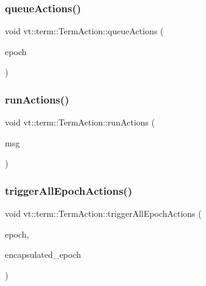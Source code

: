 \mbox{\label{structvt_1_1term_1_1_term_action_a12fe44411dad9ec9564adb12ed82a35f}} 
\subsubsection{\texorpdfstring{queue\+Actions()}{queueActions()}}
{\footnotesize\ttfamily void vt\+::term\+::\+Term\+Action\+::queue\+Actions (\begin{DoxyParamCaption}\item[{\hyperlink{namespacevt_a81d11b28122d43bf9834577e4a06440f}{Epoch\+Type}}]{epoch }\end{DoxyParamCaption})\hspace{0.3cm}{\ttfamily [protected]}}

\mbox{\label{structvt_1_1term_1_1_term_action_a13f4ee69a6e01f65de03320904737c64}} 
\subsubsection{\texorpdfstring{run\+Actions()}{runActions()}}
{\footnotesize\ttfamily void vt\+::term\+::\+Term\+Action\+::run\+Actions (\begin{DoxyParamCaption}\item[{\hyperlink{structvt_1_1term_1_1_term_action_1_1_action_msg}{Action\+Msg} $\ast$}]{msg }\end{DoxyParamCaption})\hspace{0.3cm}{\ttfamily [static]}}

\mbox{\label{structvt_1_1term_1_1_term_action_a06484cf174bebec361ce93af0f0cdec3}} 
\subsubsection{\texorpdfstring{trigger\+All\+Epoch\+Actions()}{triggerAllEpochActions()}}
{\footnotesize\ttfamily void vt\+::term\+::\+Term\+Action\+::trigger\+All\+Epoch\+Actions (\begin{DoxyParamCaption}\item[{\hyperlink{namespacevt_a81d11b28122d43bf9834577e4a06440f}{Epoch\+Type}}]{epoch,  }\item[{\hyperlink{namespacevt_a81d11b28122d43bf9834577e4a06440f}{Epoch\+Type}}]{encapsulated\+\_\+epoch }\end{DoxyParamCaption})\hspace{0.3cm}{\ttfamily [protected]}}



